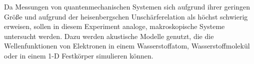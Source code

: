 Da Messungen von quantenmechanischen Systemen sich aufgrund ihrer geringen Größe und aufgrund der heisenbergschen
Unschärferelation als höchst schwierig erweisen,
sollen in diesem Experiment analoge, makroskopische Systeme untersucht werden. Dazu werden akustische Modelle genutzt,
die die Wellenfunktionen von Elektronen in einem Wasserstoffatom, Wasserstoffmolekül oder in einem 1-D Festkörper
simulieren können.
